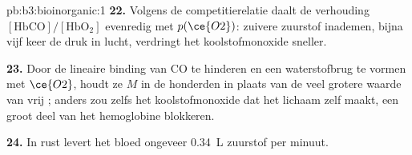 \begin{solution}{pb:b3:bioinorganic:1}
\textbf{22.} Volgens de competitierelatie daalt de verhouding $[\mathrm{HbCO}]/[\mathrm{HbO_2}]$ evenredig met $p(\ce{O2})$:
zuivere zuurstof inademen, bijna vijf keer de druk in lucht, verdringt
het koolstofmonoxide sneller.

\textbf{23.} Door de lineaire binding van CO te hinderen en een
waterstofbrug te vormen met $\ce{O2}$, houdt ze $M$ in
de honderden in plaats van de veel grotere waarde van vrij ; anders
zou zelfs het koolstofmonoxide dat het lichaam zelf maakt, een groot deel
van het hemoglobine blokkeren.

\textbf{24.} In rust levert het bloed ongeveer \qty{0.34}{L} zuurstof per minuut.
\end{solution}
